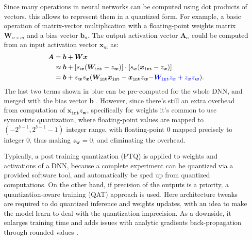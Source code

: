 Since many operations in neural networks can be computed using dot products of vectors, this allows to represent them in a quantized form. For example, a basic operation of matrix-vector multiplication with a floating-point weights matrix $\bm{W}_{n \times m}$ and a bias vector $\bm{b}_n$. The output activation vector $\bm{A}_n$  could be computed from an input activation vector $\bm{x}_m$ as:
\setlength\abovedisplayskip{0pt}
\begin{align}
\begin{split}
	\bm{A} &= \bm{b} + \bm{W} \bm{x}\\
  &\approx \bm{b}
  + [s_{\bm{w}} (\bm{W}_{\mathtt{int}} - z_{\bm{w}})]
  \cdot [s_{\bm{x}} (\bm{x}_{\mathtt{int}} - z_{\bm{x}})] \\
  &=\bm{b}
  + s_{\bm{w}} s_{\bm{x}} ( 
  \bm{W}_{\mathtt{int}} \bm{x}_{\mathtt{int}}
  - \bm{x}_{\mathtt{int}} z_{\bm{w}}
  \textcolor{blue}{- \bm{W}_{\mathtt{int}} z_{\bm{x}}
  + z_{\bm{x}} z_{\bm{w}}}).
	\setlength\belowdisplayskip{2pt}
\end{split}
\end{align} The last two terms shown in blue can be pre-computed for the whole DNN, and merged with the bias vector $\bm{b}$ \cite{dnn:quant-white21}. However, since there's still an extra overhead from computation of $\bm{x}_{\mathtt{int}} z_{\bm{w}}$, specifically for weights it's common to use symmetric quantization, where floating-point values are mapped to $(-2^{b-1}, 2^{b-1}-1)$ integer range, with floating-point 0 mapped precisely to integer 0, thus making $z_{\bm{w}} = 0$, and eliminating the overhead. 

Typically, a post training quantization (PTQ) is applied to weights and activations of a DNN, because a complete experiment can be quantized via a provided software tool, and automatically be sped up from quantized computations. On the other hand, if precision of the outputs is a priority, a  quantization-aware training (QAT) \cite{quant:qat18} approach is used. Here architecture tweaks are required to do quantized inference and weights updates, with an idea to make the model learn to deal with the quantization imprecision. As a downside, it enlarges training time and adds issues with analytic gradients back-propagation through rounded values \cite{quant:straight-through-estimator13}.

